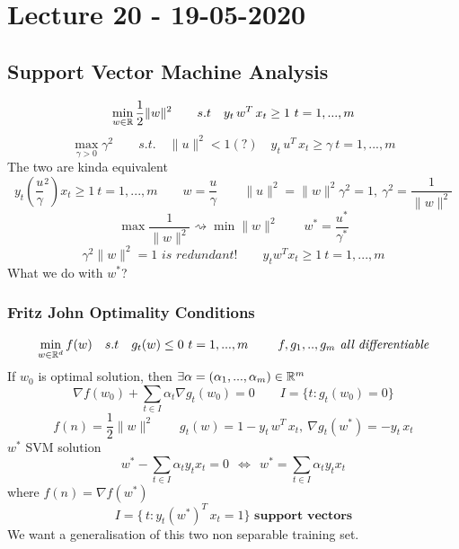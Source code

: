 \documentclass[../main.tex]{subfiles}
\begin{document}
\chapter{Lecture 20 - 19-05-2020}

\section{Support Vector Machine Analysis}

$$
\min_{w \in \mathbb{R}} \frac{1}{2}
 \| w\|^2 \qquad s.t \quad y_t \, w^T \, x_t \geq 1 \ t =1 ,...,m$$
 $$
 \max_{\gamma >0} \gamma^2 \qquad s.t. \quad \|u\|^2 < 1 (?) \quad y_t \, u^T \, x_t \geq \gamma \ t = 1,...,m
 $$
 The two are kinda equivalent
 $$
 y_t \left( \frac{u}{\gamma}^2  \right) x_t \geq 1 \ t=1,...,m \qquad w = \frac{u}{\gamma} \qquad \|u\|^2 = \|w\|^2 \gamma^2 = 1, \ \gamma^2 = \frac{1}{\|w\|^2}
 $$
 $$
 \max \frac{1}{\|w\|^2} \rightsquigarrow \min \|w\|^2 \qquad w^* = \frac{u^*}{\gamma^*}
 $$
 $$
 \gamma^2 \| w\|^2 = 1 \textit{ is redundant!} \qquad y_t w^T x_t \geq 1 \ t=1,...,m
 $$
What we do with $w^*$?
\\
\subsection{Fritz John Optimality Conditions}
$$
\min_{w \in \mathbb{R}^d} f(w) \quad s.t \quad g_t(w) \leq 0 \ t=1,...,m \qquad \textit{ $f,g_1,..,g_m$ all differentiable}
$$
If $w_0$ is optimal solution, then $\exists \alpha = (\alpha_1,...,\alpha_m) \in \mathbb{R}^m$
\\
$$
\nabla f(w_0) + \sum_{t  \in I} \alpha_t \nabla g_t (w_0) = 0 \qquad I = \{ t : g_t(w_0) = 0 \}
$$
$$
f(n) = \frac{1}{2} \| w \|^2 \qquad g_t(w)=  1 - y_t \, w^T \, x_t, \ \nabla g_t(w^*) =  - y_t \, x_t
$$
$w^*$ SVM solution
$$
w^* - \sum_{t \in I} \alpha_t y_t x_t = 0 \ \ \Leftrightarrow \ \ w^* = \sum_{t \in I} \alpha_t y_t x_t
$$
where $f(n) = \nabla f(w^*)$
$$
I = \{ \, t : y_t(w^*)^T \, x_t = 1 \} \textbf{ support vectors}
$$
We want a generalisation of this two non separable training set.
\\
\end{document}
